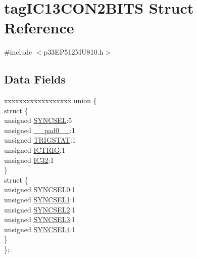 \hypertarget{structtag_i_c13_c_o_n2_b_i_t_s}{}\section{tag\+I\+C13\+C\+O\+N2\+B\+I\+TS Struct Reference}
\label{structtag_i_c13_c_o_n2_b_i_t_s}


{\ttfamily \#include $<$p33\+E\+P512\+M\+U810.\+h$>$}

\subsection*{Data Fields}
\begin{DoxyCompactItemize}
\item 
\begin{tabbing}
xx\=xx\=xx\=xx\=xx\=xx\=xx\=xx\=xx\=\kill
union \{\\
\>struct \{\\
\>\>unsigned \hyperlink{structtag_i_c13_c_o_n2_b_i_t_s_a35fbbe11485c2615ed27535b62c3fa35}{SYNCSEL}:5\\
\>\>unsigned \hyperlink{structtag_i_c13_c_o_n2_b_i_t_s_adf71f3d8410c1f1dbbc96680a92c49af}{\_\_pad0\_\_}:1\\
\>\>unsigned \hyperlink{structtag_i_c13_c_o_n2_b_i_t_s_ab379549de54ac93ad4aa73686c34cb7c}{TRIGSTAT}:1\\
\>\>unsigned \hyperlink{structtag_i_c13_c_o_n2_b_i_t_s_a79bd14cfd2e403f3a96ce0b3bb58097b}{ICTRIG}:1\\
\>\>unsigned \hyperlink{structtag_i_c13_c_o_n2_b_i_t_s_afc705120246cb4ca0c93c87817519b7f}{IC32}:1\\
\>\} \\
\>struct \{\\
\>\>unsigned \hyperlink{structtag_i_c13_c_o_n2_b_i_t_s_a3b5df3154fde5141e6ac0156425ff8b4}{SYNCSEL0}:1\\
\>\>unsigned \hyperlink{structtag_i_c13_c_o_n2_b_i_t_s_a50e73f95ab1c258ddc64f69c0991deaf}{SYNCSEL1}:1\\
\>\>unsigned \hyperlink{structtag_i_c13_c_o_n2_b_i_t_s_a304907a5d2c4cbf1114a54642a85951e}{SYNCSEL2}:1\\
\>\>unsigned \hyperlink{structtag_i_c13_c_o_n2_b_i_t_s_a6bbd1bd2ead6c9fa713969c6eb0f0c75}{SYNCSEL3}:1\\
\>\>unsigned \hyperlink{structtag_i_c13_c_o_n2_b_i_t_s_a0cd5bbe196c7974953909d27a6307bb7}{SYNCSEL4}:1\\
\>\} \\
\}; \\

\end{tabbing}\end{DoxyCompactItemize}


